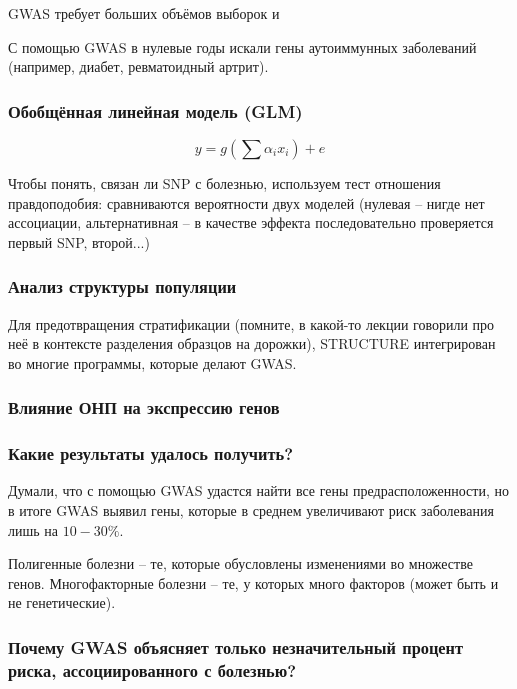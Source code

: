 \documentclass[main.tex]{subfiles}
\begin{document}
GWAS требует больших объёмов выборок и

С помощью GWAS в нулевые годы искали гены аутоиммунных заболеваний (например, диабет, ревматоидный артрит).

\subsubsection{Обобщённая линейная модель (GLM)}

$$ y = g(\sum \alpha_i x_i) + e $$

Чтобы понять, связан ли SNP с болезнью, используем тест отношения правдоподобия: сравниваются вероятности двух моделей (нулевая -- нигде нет ассоциации, альтернативная -- в качестве эффекта последовательно проверяется первый SNP, второй...) %

\subsubsection{Анализ структуры популяции}

Для предотвращения стратификации (помните, в какой-то лекции говорили про неё в контексте разделения образцов на дорожки), %
STRUCTURE интегрирован во многие программы, которые делают GWAS.

\subsubsection{Влияние ОНП на экспрессию генов}


\subsubsection{Какие результаты удалось получить?}

Думали, что с помощью  GWAS удастся найти все гены предрасположенности, но в итоге GWAS выявил гены, которые в среднем увеличивают риск заболевания лишь на $ 10-30 \% $.

\begin{leftbar}
    Полигенные болезни -- те, которые обусловлены изменениями во множестве генов.
    Многофакторные болезни -- те, у которых много факторов (может быть и не генетические).
\end{leftbar}

\subsubsection{ Почему GWAS объясняет только незначительный процент риска, ассоциированного с болезнью? }
\end{document}
